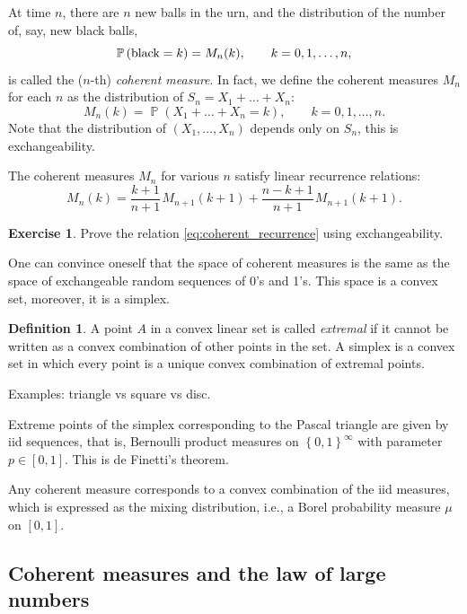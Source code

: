 \documentclass[letterpaper,11pt,oneside,reqno]{article}
\numberwithin{equation}{section}
\newcommand{\ssp}{\hspace{1pt}}
\theoremstyle{definition}
\newtheorem{definition}[proposition]{Definition}
\newtheorem{exercise}[proposition]{Exercise}
\begin{document}
At time $n$, there are $n$ new balls in the urn, and the distribution of the number of, say,
new black balls,
\begin{equation*}
	\operatorname{\mathbb{P}}\left( \textnormal{black}=k \right) = M_n(k),
	\qquad k=0,1,\ldots,n,
\end{equation*}
is called the ($n$-th) \emph{coherent measure}.
In fact, we define the coherent measures
$M_n$ for each $n$ as the distribution of
$S_n=X_1+\ldots+X_n $:
\begin{equation*}
	M_n(k)=\operatorname{\mathbb{P}}\left(
	X_1+\ldots+X_n=k\right),\qquad k=0,1,\ldots,n.
\end{equation*}
Note that the distribution of
$(X_1,\ldots,X_n )$ depends only on
$S_n$, this is exchangeability.

The coherent measures $M_n$ for various $n$ satisfy linear
recurrence relations:
\begin{equation}
	\label{eq:coherent_recurrence}
	M_n(k)=
	\frac{k+1}{n+1}\ssp M_{n+1}(k+1)
	+
	\frac{n-k+1}{n+1}\ssp M_{n+1}(k+1).
\end{equation}
\begin{exercise}
	Prove the relation \eqref{eq:coherent_recurrence}
	using exchangeability.
\end{exercise}

One can convince oneself that the space of coherent measures is
the same as the space of exchangeable random sequences of 0's and 1's.
This space is a convex set, moreover, it is a simplex.

\begin{definition}
	A point $A$ in a convex linear set is called
	\emph{extremal} if it cannot be written as a convex combination of other points in the set.
	A simplex is a convex set in which every point is a unique
	convex combination of extremal points.

	Examples: triangle vs square vs disc.
\end{definition}

Extreme points of the simplex corresponding to the Pascal triangle
are given by iid sequences,
that is, Bernoulli product measures on $\left\{ 0,1 \right\}^\infty$ with
parameter $p\in[0,1]$.
This is de Finetti's theorem.

Any coherent measure corresponds to a convex combination of the iid measures,
which is expressed as the mixing distribution, i.e., a Borel
probability measure $\mu$ on $[0,1]$.

\subsection{Coherent measures and the law of large numbers}
\end{document}
